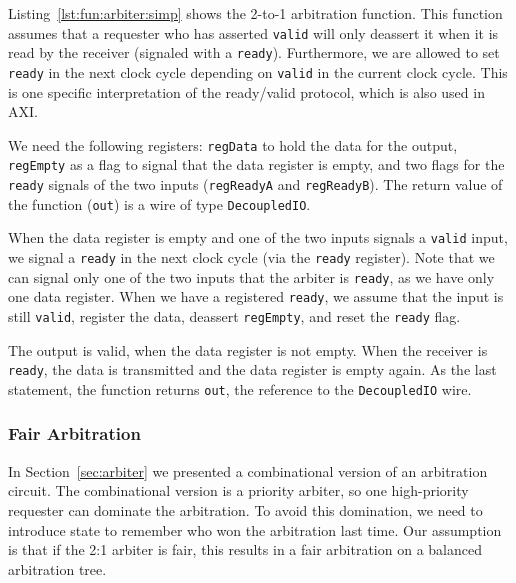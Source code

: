 \documentclass[%
    10pt,
    headinclude, footexclude,
    openright, %
    notitlepage,
    cleardoubleempty,
    headsepline,
    pointlessnumbers,
    bibtotoc, idxtotoc,
    ]{scrbook}
\newcommand{\code}[1]{{\lstinline[basicstyle=\small\ttfamily]{#1}}}
\begin{document}
Listing~\ref{lst:fun:arbiter:simp} shows the 2-to-1 arbitration function. This function assumes
that a requester who has asserted \code{valid} will only deassert it when it is read by the receiver
(signaled with a \code{ready}). Furthermore, we are allowed to set \code{ready} in the next clock cycle
depending on \code{valid} in the current clock cycle.
This is one specific interpretation of the ready/valid protocol, which is also used in AXI.


We need the following registers: \code{regData} to hold the data for the output, \code{regEmpty} as a  flag to
signal that the data register is empty, and two flags for the \code{ready} signals of the two inputs
(\code{regReadyA} and \code{regReadyB}).
The return value of the function (\code{out}) is a wire of type \code{DecoupledIO}.

When the data register is empty and one of the two inputs signals a \code{valid} input,
we signal a \code{ready} in the next clock cycle (via the \code{ready} register).
Note that we can signal only one of the two inputs that the arbiter is \code{ready},
as we have only one data register.
When we have a registered \code{ready}, we assume that the input is still \code{valid},
register the data, deassert \code{regEmpty}, and reset the \code{ready} flag.

The output is valid, when the data register is not empty. When the receiver is \code{ready},
the data is transmitted and the data register is empty again.
As the last statement, the function returns \code{out}, the reference to the \code{DecoupledIO}
wire.


\subsubsection{Fair Arbitration}

In Section~\ref{sec:arbiter} we presented a combinational version of an arbitration circuit.
The combinational version is a priority arbiter, so one high-priority requester can
dominate the arbitration.
To avoid this domination, we need to introduce state to remember who won the arbitration last time.
Our assumption is that if the 2:1 arbiter is fair, this results in a fair
arbitration on a balanced arbitration tree.

\end{document}
